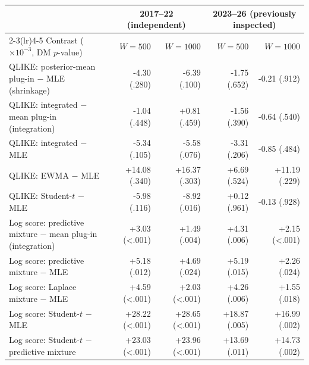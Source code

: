 \begin{tabular}{lrrrr}\toprule
 & \multicolumn{2}{c}{2017--22 (independent)} & \multicolumn{2}{c}{2023--26 (previously inspected)}\\\cmidrule(lr){2-3}\cmidrule(lr){4-5}
Contrast ($\times10^{-3}$, DM $p$-value) & $W{=}500$ & $W{=}1000$ & $W{=}500$ & $W{=}1000$\\\midrule
QLIKE: posterior-mean plug-in $-$ MLE (shrinkage) & -4.30 (.280) & -6.39 (.100) & -1.75 (.652) & -0.21 (.912) \\
QLIKE: integrated $-$ mean plug-in (integration) & -1.04 (.448) & +0.81 (.459) & -1.56 (.390) & -0.64 (.540) \\
QLIKE: integrated $-$ MLE & -5.34 (.105) & -5.58 (.076) & -3.31 (.206) & -0.85 (.484) \\
QLIKE: EWMA $-$ MLE & +14.08 (.340) & +16.37 (.303) & +6.69 (.524) & +11.19 (.229) \\
QLIKE: Student-$t$ $-$ MLE & -5.98 (.116) & -8.92 (.016) & +0.12 (.961) & -0.13 (.928) \\
\midrule
Log score: predictive mixture $-$ mean plug-in (integration) & +3.03 (<.001) & +1.49 (.004) & +4.31 (.006) & +2.15 (<.001) \\
Log score: predictive mixture $-$ MLE & +5.18 (.012) & +4.69 (.024) & +5.19 (.015) & +2.26 (.024) \\
Log score: Laplace mixture $-$ MLE & +4.59 (<.001) & +2.03 (<.001) & +4.26 (.006) & +1.55 (.018) \\
Log score: Student-$t$ $-$ MLE & +28.22 (<.001) & +28.65 (<.001) & +18.87 (.005) & +16.99 (.002) \\
Log score: Student-$t$ $-$ predictive mixture & +23.03 (<.001) & +23.96 (<.001) & +13.69 (.011) & +14.73 (.002) \\
\bottomrule\end{tabular}
